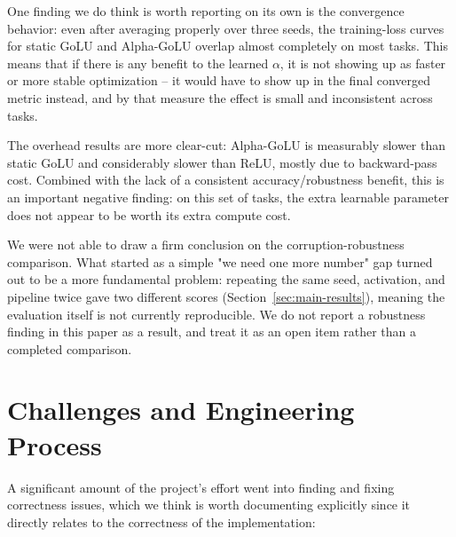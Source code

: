 \documentclass[conference]{IEEEtran}
\begin{document}
One finding we do think is worth reporting on its own is the convergence behavior: even after averaging properly over three seeds, the training-loss curves for static GoLU and Alpha-GoLU overlap almost completely on most tasks. This means that if there is any benefit to the learned $\alpha$, it is not showing up as faster or more stable optimization -- it would have to show up in the final converged metric instead, and by that measure the effect is small and inconsistent across tasks.

The overhead results are more clear-cut: Alpha-GoLU is measurably slower than static GoLU and considerably slower than ReLU, mostly due to backward-pass cost. Combined with the lack of a consistent accuracy/robustness benefit, this is an important negative finding: on this set of tasks, the extra learnable parameter does not appear to be worth its extra compute cost.

We were not able to draw a firm conclusion on the corruption-robustness comparison. What started as a simple "we need one more number" gap turned out to be a more fundamental problem: repeating the same seed, activation, and pipeline twice gave two different scores (Section~\ref{sec:main-results}), meaning the evaluation itself is not currently reproducible. We do not report a robustness finding in this paper as a result, and treat it as an open item rather than a completed comparison.

\section{Challenges and Engineering Process}
\label{sec:challenges}

A significant amount of the project's effort went into finding and fixing correctness issues, which we think is worth documenting explicitly since it directly relates to the correctness of the implementation:
\end{document}
